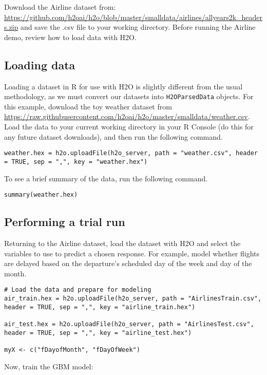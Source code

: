 {Download the Airline dataset from: {\url{https://github.com/h2oai/h2o/blob/master/smalldata/airlines/allyears2k_headers.zip}} and save the .csv file to your working directory. Before running the Airline demo, review how to load data with H2O. 

\subsection{Loading data}  

Loading a dataset in R for use with H2O is slightly different from the usual methodology, as we must convert our datasets into \texttt{H2OParsedData} objects. For this example, download the toy weather dataset from {\url{https://raw.githubusercontent.com/h2oai/h2o/master/smalldata/weather.csv}}.  Load the data to your current working directory in your R Console (do this for any future dataset downloads), and then run the following command.
\begin{lstlisting}[style=R]
weather.hex = h2o.uploadFile(h2o_server, path = "weather.csv", header = TRUE, sep = ",", key = "weather.hex")
\end{lstlisting}
\bigskip
\noindent
To see a brief summary of the data, run the following command.
\begin{lstlisting}[style=R]
summary(weather.hex)
\end{lstlisting}


\subsection{Performing a trial run}  
Returning to the Airline dataset, load the dataset with H2O and select the variables to use to predict a chosen response. For example, model whether flights are delayed based on the departure's scheduled day of the week and day of the month.

\begin{lstlisting}[style=R]
# Load the data and prepare for modeling
air_train.hex = h2o.uploadFile(h2o_server, path = "AirlinesTrain.csv", header = TRUE, sep = ",", key = "airline_train.hex")

air_test.hex = h2o.uploadFile(h2o_server, path = "AirlinesTest.csv", header = TRUE, sep = ",", key = "airline_test.hex")

myX <- c("fDayofMonth", "fDayOfWeek")

\end{lstlisting}

Now, train the GBM model:

}

